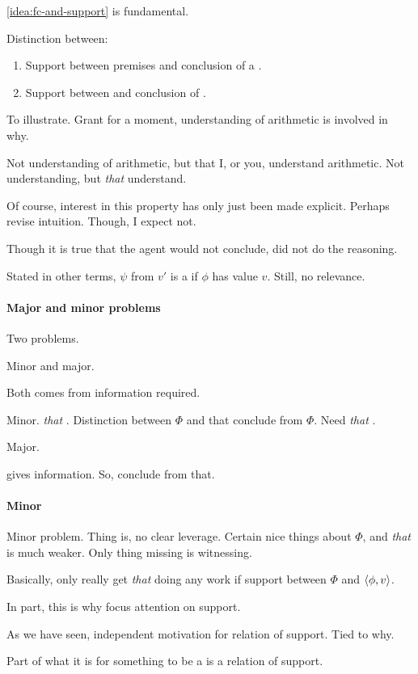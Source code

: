 \begin{note}
  \autoref{idea:fc-and-support} is fundamental.

  Distinction between:
  \begin{enumerate}
  \item
    Support between premises and conclusion of a .
  \item
    Support between  and conclusion of .
  \end{enumerate}

  To illustrate.
  Grant for a moment, understanding of arithmetic is involved in why.

  Not understanding of arithmetic, but that I, or you, understand arithmetic.
  Not understanding, but \emph{that} understand.
\end{note}

\begin{note}
  Of course, interest in this property has only just been made explicit.
  Perhaps revise intuition.
  Though, I expect not.

  Though it is true that the agent would not conclude, did not do the reasoning.

  Stated in other terms, \(\psi\) from \(v'\) is a \fc{} if \(\phi\) has value \(v\).
  Still, no relevance.
\end{note}

\paragraph*{Major and minor problems}

\begin{note}
  Two problems.

  Minor and major.

  Both comes from information required.

  Minor.
  \emph{that} .
  Distinction between \(\Phi\) and that conclude from \(\Phi\).
  Need \emph{that} .

  Major.

  \itp{} gives information.
  So, conclude from that.
\end{note}

\paragraph*{Minor}

\begin{note}[Minor]
  Minor problem.
  Thing is, no clear leverage.
  Certain nice things about \(\Phi\), and \emph{that}  is much weaker.
  Only thing missing is witnessing.

  Basically, only really get \emph{that}  doing any work if support between \(\Phi\) and \(\langle \phi, v \rangle\).

  In part, this is why focus attention on support.

  As we have seen, independent motivation for relation of support.
  Tied to why.

  Part of what it is for something to be a  is a relation of support.
\end{note}

